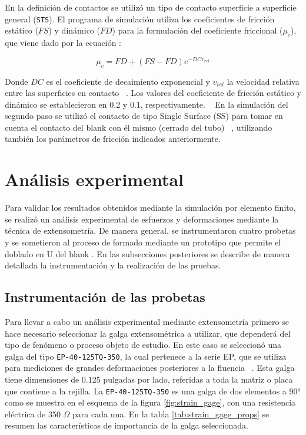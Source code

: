 En la definición de contactos se utilizó un tipo de contacto superficie a superficie
general (\texttt{STS}). El programa de simulación utiliza los coeficientes de fricción 
estático ($FS$) y dinámico ($FD$) para la formulación del coeficiente friccional ($\mu_c$),
que viene dado por la ecuación :

\begin{equation}
\mu_c = FD + (FS - FD) e^{-DCv_{rel}}
\label{eq:frictional_coeff}
\end{equation}

Donde $DC$ es el coeficiente de decaimiento exponencial y $v_{rel}$ la velocidad relativa
entre las superficies en contacto ~\cite{lsdyna-manual}. Los valores del coeficiente de 
fricción estático y dinámico se establecieron en 0.2 y 0.1, respectivamente. ~\cite{carvill1993}
En la simulación del segundo paso se utilizó el contacto de tipo Single Surface (SS) para 
tomar en cuenta el contacto del blank con él mismo (cerrado del tubo) ~\cite{lsdyna-manual}, 
utilizando también los parámetros de fricción indicados anteriormente.

\section{Análisis experimental}\label{sec:analisis-experimental}

Para validar los resultados obtenidos mediante la simulación por elemento finito, se realizó 
un análisis experimental de esfuerzos y deformaciones mediante la técnica de extensometría. 
De manera general, se instrumentaron cuatro probetas y se sometieron al proceso de formado 
mediante un prototipo que permite el doblado en U del blank . En las subsecciones posteriores se describe 
de manera detallada la instrumentación y la realización de las pruebas.

\subsection{Instrumentación de las probetas}

Para llevar a cabo un análisis experimental mediante extensometría primero se hace necesario 
seleccionar la galga extensométrica a utilizar, que dependerá del tipo de fenómeno o proceso 
objeto de estudio. En este caso se seleccionó una galga del tipo \texttt{EP-40-125TQ-350}, la 
cual pertenece a la serie EP, que se utiliza para mediciones de grandes deformaciones posteriores 
a la fluencia ~\cite{vishay-catalog}. Esta galga tiene dimensiones de 0.125 pulgadas por lado, referidas a toda la 
matriz o placa que contiene a la rejilla. La \texttt{EP-40-125TQ-350} es una galga de dos 
elementos a 90° como se muestra en el esquema de la figura \ref{fig:strain_gage}, con 
una resistencia eléctrica de 350 $\Omega$ para cada una. En la tabla \ref{tab:strain_gage_props} 
se resumen las características de importancia de la galga seleccionada.

